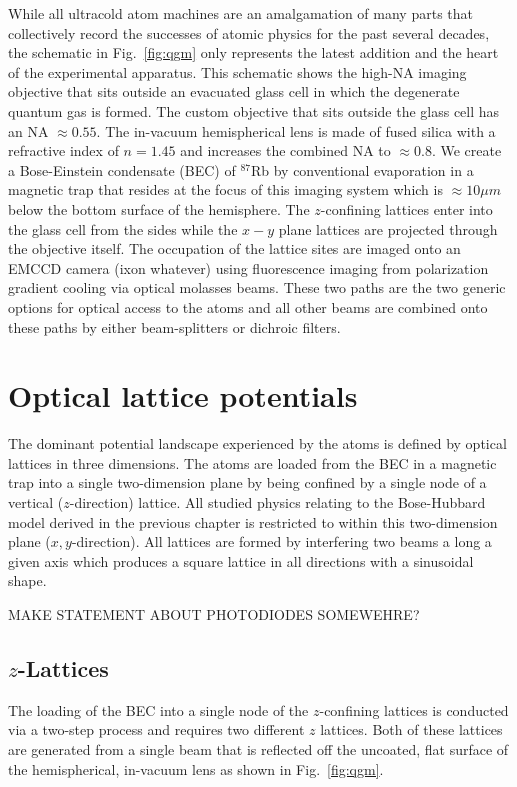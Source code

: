 While all ultracold atom machines are an amalgamation of many parts that collectively record the successes of atomic physics for the past several decades, the schematic in Fig.~\ref{fig:qgm} only represents the latest addition and the heart of the experimental apparatus. This schematic shows the high-NA imaging objective that sits outside an evacuated glass cell in which the degenerate quantum gas is formed. The custom objective that sits outside the glass cell has an NA $\approx 0.55$. The in-vacuum hemispherical lens is made of fused silica with a refractive index of $n=1.45$ and increases the combined NA to $\approx 0.8$.  We create a Bose-Einstein condensate (BEC) of $^{87}$Rb by conventional evaporation in a magnetic trap that resides at the focus of this imaging system which is $\approx 10\mu m$ below the bottom surface of the hemisphere. The $z$-confining lattices enter into the glass cell from the sides while the $x-y$ plane lattices are projected through the objective itself. The occupation of the lattice sites are imaged onto an EMCCD camera (ixon whatever) using fluorescence imaging from polarization gradient cooling via optical molasses beams. These two paths are the two generic options for optical access to the atoms and all other beams are combined onto these paths by either beam-splitters or dichroic filters.

\section{Optical lattice potentials}

The dominant potential landscape experienced by the atoms is defined by optical lattices in three dimensions. The atoms are loaded from the BEC in a magnetic trap into a single two-dimension plane by being confined by a single node of a vertical ($z$-direction) lattice. All studied physics relating to the Bose-Hubbard model derived in the previous chapter is restricted to within this two-dimension plane ($x,y$-direction). All lattices are formed by interfering two beams a long a given axis which produces a square lattice in all directions with a sinusoidal shape.


MAKE STATEMENT ABOUT PHOTODIODES SOMEWEHRE?

\subsection{$z$-Lattices}

The loading of the BEC into a single node of the $z$-confining lattices is conducted via a two-step process and requires two different $z$ lattices. Both of these lattices are generated from a single beam that is reflected off the uncoated, flat surface of the hemispherical, in-vacuum lens as shown in Fig.~\ref{fig:qgm}. 


